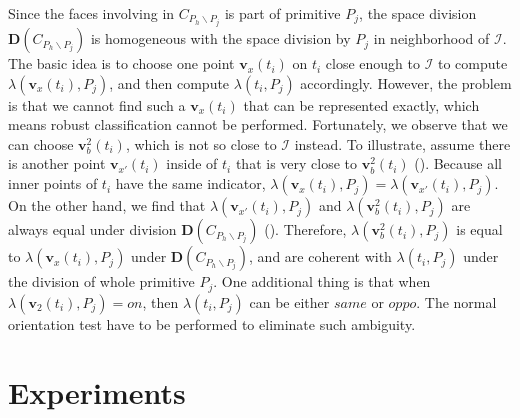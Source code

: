\documentclass[10pt,journal,compsoc]{IEEEtran}
\begin{document}
Since the faces involving in $C_{P_h \backslash P_j}$ is part of primitive $P_j$, the space division $\boldsymbol{D}(C_{P_h \backslash P_j})$ is homogeneous with the space division by $P_j$ in neighborhood of $\bm{\mathcal{I}}$. The basic idea is to choose one point $\bm{v}_x(t_i)$ on $t_i$ close enough to $\bm{\mathcal{I}}$ to compute $\lambda(\bm{v}_x(t_i), P_j)$, and then compute $\lambda(t_i, P_j)$ accordingly. However, the problem is that we cannot find such a $\bm{v}_x(t_i)$ that can be represented exactly, which means robust classification cannot be performed. Fortunately, we observe that we can choose $\bm{v}_b^2(t_i)$, which is not so close to $\bm{\mathcal{I}}$ instead. To illustrate, assume there is another point $\bm{v}_{x'}(t_i)$ inside of $t_i$ that is very close to $\bm{v}_b^2(t_i)$ ({\color{red}{Fig. x}}). Because all inner points of $t_i$ have the same indicator, $\lambda(\bm{v}_x(t_i), P_j) = \lambda(\bm{v}_{x'}(t_i), P_j)$. On the other hand, we find that $\lambda(\bm{v}_{x'}(t_i), P_j)$ and $\lambda(\bm{v}_b^2(t_i), P_j)$ are always equal under division $\boldsymbol{D}(C_{P_h \backslash P_j})$ ({}). Therefore, $\lambda(\bm{v}_b^2(t_i), P_j)$ is equal to $\lambda(\bm{v}_x(t_i), P_j)$ under $\boldsymbol{D}(C_{P_h \backslash P_j})$, and are coherent with $\lambda(t_i, P_j)$ under the division of whole primitive $P_j$. One additional thing is that when $\lambda(\bm{v}_2(t_i), P_j)=on$, then $\lambda(t_i, P_j)$ can be either $same$ or $oppo$. The normal orientation test have to be performed to eliminate such ambiguity.

\fi
\section{Experiments}
\end{document}

